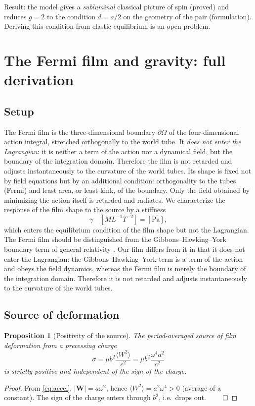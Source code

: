 \documentclass[12pt,a4paper]{article}
\newtheorem{proposition}{Proposition}
\begin{document}
Result: the model gives a \emph{subluminal} classical picture of spin (proved) and
reduces $g=2$ to the condition $d=a/2$ on the geometry of the pair (formulation).
Deriving this condition from elastic equilibrium is an open problem.

\section{The Fermi film and gravity: full derivation}

\subsection{Setup}
The Fermi film is the three-dimensional boundary $\partial\Omega$ of the
four-dimensional action integral, stretched orthogonally to the world tube. It
\emph{does not enter the Lagrangian}: it is neither a term of the action nor a
dynamical field, but the boundary of the integration domain. Therefore the film
is not retarded and adjusts instantaneously to the curvature of the world tubes.
Its shape is fixed not by field equations but by an additional condition:
orthogonality to the tubes (Fermi) and least area, or least kink, of the
boundary. Only the field obtained by minimizing the action itself is retarded
and radiates. We characterize the response of the film shape to the source by a
stiffness
\begin{equation}
\gamma\quad[ML^{-1}T^{-2}]=[\text{Pa}],
\end{equation}
which enters the equilibrium condition of the film shape but not the Lagrangian. The Fermi film should be distinguished from the Gibbons--Hawking--York
boundary term of general relativity \cite{hehl1995}. Our film differs from it in
that it does not enter the Lagrangian: the Gibbons--Hawking--York term is a term
of the action and obeys the field dynamics, whereas the Fermi film is merely the
boundary of the integration domain. Therefore it is not retarded and adjusts
instantaneously to the curvature of the world tubes.

\subsection{Source of deformation}
\begin{proposition}[Positivity of the source]
The period-averaged source of film deformation from a precessing charge
\begin{equation}
\sigma = \mu b^2 \frac{\langle W^2\rangle}{c^2}
= \mu b^2 \frac{\omega^4 a^2}{c^2}
\end{equation}
is strictly positive and independent of the sign of the charge.
\end{proposition}
\begin{proof}
From \eqref{eq:accel}, $|\mathbf{W}|=a\omega^2$, hence $\langle W^2\rangle=
a^2\omega^4>0$ (average of a constant). The sign of the charge enters through
$b^2$, i.e.\ drops out. $\qed$
\end{proof}
\end{document}
